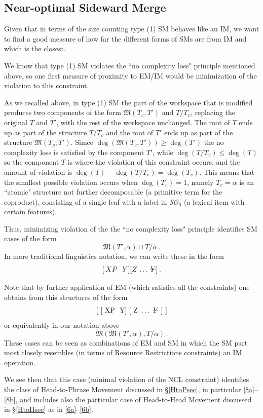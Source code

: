 \documentclass[12pt]{amsart}
\numberwithin{equation}{section}
\def\cO{{\mathcal O}}
\def\cS{{\mathcal S}}
\def\fM{{\mathfrak M}}
\begin{document}
\subsection{Near-optimal Sideward Merge}\label{SMnearIM}
Given that in terms of the size counting type (1) SM behaves
like an IM, we want to find a good measure of how far the
different forms of SMs are from IM and which is the closest.

We know that type (1) SM violates the ``no complexity loss" 
principle mentioned above, so one first measure of proximity
to EM/IM would be minimization of the violation to this
constraint. 

As we recalled above, in type (1) SM the part of the workspace 
that is modified produces two components of the form 
$\fM(T_v, T')$ and $T/T_v$, replacing the original $T$ and $T'$,
with the rest of the workspace unchanged. The root of $T$
ends up as part of the structure $T/T_v$ and the root of $T'$
ends up as part of the structure $\fM(T_v, T')$. Simce
$\deg(\fM(T_v, T'))\geq \deg(T')$ the no complexity loss
is satisfied by the component $T'$, while $\deg(T/T_v)\leq \deg(T)$
so the component $T$ is where the violation of this constraint
occurs, and the amount of violation is $\deg(T)-\deg(T/T_v)=\deg(T_v)$.
This means that the smallest possible violation occurs when
$\deg(T_v)=1$, namely $T_v=\alpha$ is an ``atomic" structure
not further decomposable (a primitive term for the coproduct),
consisting of a single leaf with a label in $\cS\cO_0$ (a lexical item
with certain features). 

Thus, minimizing violation of the the ``no complexity loss" 
principle identifies SM cases of the form
$$ \fM(T', \alpha) \sqcup T/\alpha\, . $$
In more traditional linguistics notation, we can write these
in the form 
$$ [\, XP\,\,\,\, Y ] [ Z \, \ldots\,  \text{\sout{$Y$}} ] \, . $$

Note that by further application of EM (which satisfies all
the constraints) one obtains from this structures of the form
$$ \text{[ [ XP\,\, Y] [ Z\, $\ldots$\,  \text{\sout{$Y$}} ] ]} $$
or equivalently in our notation above
$$ \fM( \fM(T', \alpha), T/\alpha ) \, . $$
These cases can be seen as combinations of EM and SM
in which the SM part most closely resembles (in terms
of Resource Restrictions constraints) an IM operation.

We see then that this case (minimal violation of the NCL constraint)
identifies the class of Head-to-Phrase Movement discussed in \S \ref{HtoPsec},
in particular \eqref{8a}--\eqref{8b}, 
and includes also the particular case of 
Head-to-Head Movement discussed in \S \ref{HtoHsec} as in
\eqref{6a}--\eqref{6b}.
\end{document}
